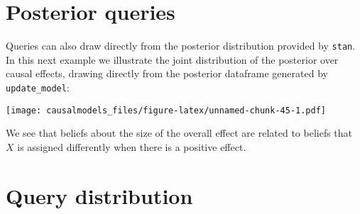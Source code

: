 \documentclass[
  12pt,
]{book}
\newenvironment{Shaded}{\begin{snugshade}}{\end{snugshade}}
\newcommand{\DataTypeTok}[1]{\textcolor[rgb]{0.13,0.29,0.53}{#1}}
\newcommand{\DecValTok}[1]{\textcolor[rgb]{0.00,0.00,0.81}{#1}}
\newcommand{\FloatTok}[1]{\textcolor[rgb]{0.00,0.00,0.81}{#1}}
\newcommand{\KeywordTok}[1]{\textcolor[rgb]{0.13,0.29,0.53}{\textbf{#1}}}
\newcommand{\NormalTok}[1]{#1}
\newcommand{\OperatorTok}[1]{\textcolor[rgb]{0.81,0.36,0.00}{\textbf{#1}}}
\newcommand{\StringTok}[1]{\textcolor[rgb]{0.31,0.60,0.02}{#1}}
\begin{document}
\hypertarget{posterior-queries}{%
\section{Posterior queries}\label{posterior-queries}}

Queries can also draw directly from the posterior distribution provided by \texttt{stan}. In this next example we illustrate the joint distribution of the posterior over causal effects, drawing directly from the posterior dataframe generated by \texttt{update\_model}:

\begin{Shaded}
\end{Shaded}

\texttt{[image: causalmodels\_files/figure-latex/unnamed-chunk-45-1.pdf]}

We see that beliefs about the size of the overall effect are related to beliefs that \(X\) is assigned differently when there is a positive effect.

\hypertarget{query-distribution}{%
\section{Query distribution}\label{query-distribution}}
\end{document}
